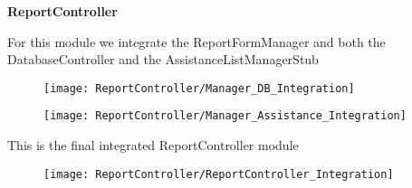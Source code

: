 \textbf{ReportController}

For this module we integrate the ReportFormManager and both the DatabaseController and the AssistanceListManagerStub
\begin{figure}[H]
\centering
\texttt{[image: ReportController/Manager\_DB\_Integration]}
\end{figure}

\begin{figure}[H]
\centering
\texttt{[image: ReportController/Manager\_Assistance\_Integration]}
\end{figure}

This is the final integrated ReportController module
\begin{figure}[H]
\centering
\texttt{[image: ReportController/ReportController\_Integration]}
\end{figure}

